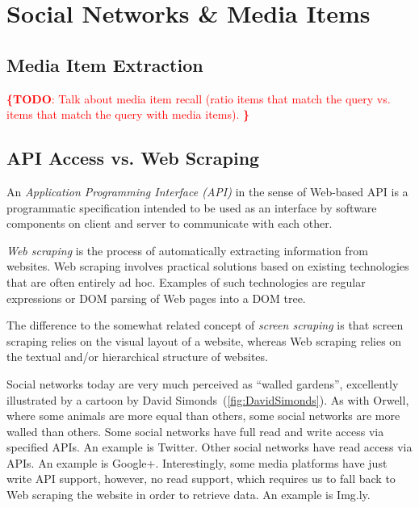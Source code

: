 \documentclass{acm_proc_article-sp}
\let\oldemph\emph
\renewcommand{\emph}[1]{\oldemph{\fontsize{9}{9}\selectfont #1}}
\newcommand{\todo}[1]{\noindent\textcolor{red}{{\bf \{TODO}: #1{\bf \}}}}
\begin{document}
\section{Social Networks \& Media Items}

\subsection{Media Item Extraction}
\todo{
Talk about media item recall (ratio items that match the query vs. items that match the query with media items).
}

\subsection{API Access vs. Web Scraping}
An \emph{Application Programming Interface (API)} in the sense of Web-based API is a programmatic specification intended to be used as an interface by software components on client and server to communicate with each other.

\emph{Web scraping} is the process of automatically extracting information from websites.
Web scraping involves practical solutions based on existing technologies that are often entirely ad hoc.
Examples of such technologies are regular expressions or DOM parsing of Web pages into a DOM tree.

The difference to the somewhat related concept of \emph{screen scraping} is that screen scraping relies on the visual layout of a website, whereas Web scraping relies on the textual and/or hierarchical structure of websites.

Social networks today are very much perceived as ``walled gardens'', excellently illustrated by a cartoon by David Simonds~(\autoref{fig:DavidSimonds}).
As with Orwell, where some animals are more equal than others, some social networks are more walled than others.
Some social networks have full read and write access via specified APIs.
An example is Twitter.
Other social networks have read access via APIs.
An example is Google+.
Interestingly, some media platforms have just write API support, however, no read support, which requires us to fall back to Web scraping the website in order to retrieve data.
An example is Img.ly.
\end{document}
